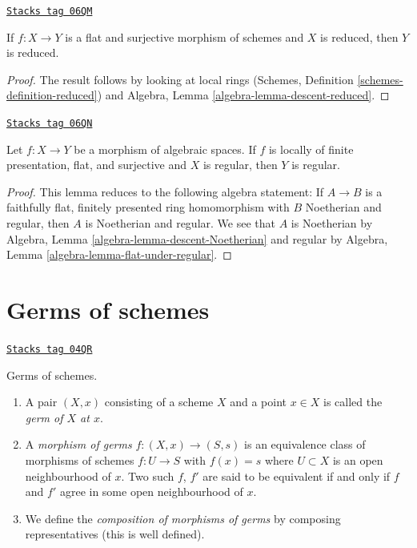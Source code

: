 \begin{lemma}
\label{descent-lemma-descend-reduced}
\href{https://stacks.math.columbia.edu/tag/06QM}{\texttt{Stacks tag 06QM}}

If $f : X \to Y$ is a flat and surjective morphism of schemes
and $X$ is reduced, then $Y$ is reduced.
\end{lemma}

\begin{proof}
The result follows by looking at local rings
(Schemes, Definition \ref{schemes-definition-reduced})
and
Algebra, Lemma \ref{algebra-lemma-descent-reduced}.
\end{proof}

\begin{lemma}
\label{descent-lemma-descend-regular}
\href{https://stacks.math.columbia.edu/tag/06QN}{\texttt{Stacks tag 06QN}}

Let $f : X \to Y$ be a morphism of algebraic spaces.
If $f$ is locally of finite presentation, flat, and surjective and
$X$ is regular, then $Y$ is regular.
\end{lemma}

\begin{proof}
This lemma reduces to the following algebra statement: If $A \to B$ is
a faithfully flat, finitely presented ring homomorphism with $B$ Noetherian
and regular, then $A$ is Noetherian and regular. We see that
$A$ is Noetherian by
Algebra, Lemma \ref{algebra-lemma-descent-Noetherian}
and regular by
Algebra, Lemma \ref{algebra-lemma-flat-under-regular}.
\end{proof}

\section{Germs of schemes}
\label{descent-section-germs}
\begin{definition}[Germs]
\label{descent-definition-germs}
\href{https://stacks.math.columbia.edu/tag/04QR}{\texttt{Stacks tag 04QR}}

Germs of schemes.
\begin{enumerate}
\item A pair $(X, x)$ consisting of a scheme $X$ and a point $x \in X$ is
called the {\it germ of $X$ at $x$}.
\item A {\it morphism of germs} $f : (X, x) \to (S, s)$
is an equivalence class of morphisms of schemes $f : U \to S$ with $f(x) = s$
where $U \subset X$ is an open neighbourhood of $x$. Two such
$f$, $f'$ are said to be equivalent if and only if $f$ and $f'$
agree in some open neighbourhood of $x$.
\item We define the {\it composition of morphisms of germs}
by composing representatives (this is well defined).
\end{enumerate}
\end{definition}

